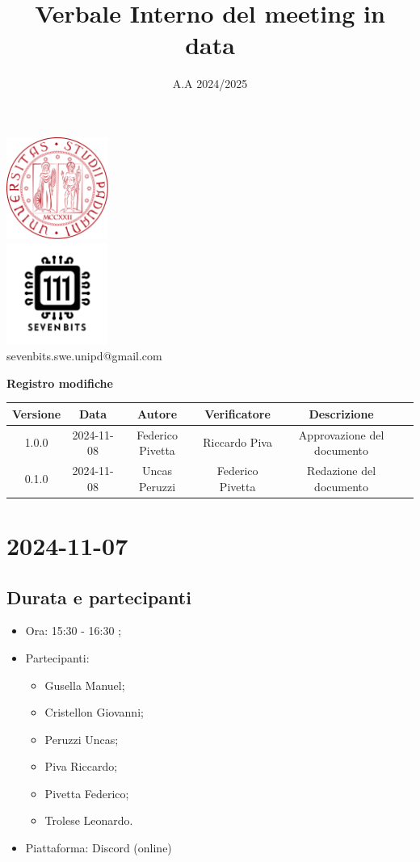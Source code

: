 \documentclass[10pt]{article}
\title{Verbale Interno del meeting in data}
\date{A.A 2024/2025}
\begin{document}
\maketitle
\center 
\includegraphics[width=0.25\textwidth]{LogoUnipd}\\
\includegraphics[width=0.25\textwidth]{Sevenbitslogo}\\
sevenbits.swe.unipd@gmail.com\\
\vspace{2mm}

\textbf{Registro modifiche}\\
\vspace{2mm}
\begin{tabular}{|c|c|c|c|c|c|}
\hline
\textbf{Versione} & \textbf{Data} & \textbf{Autore} & \textbf{Verificatore} & \textbf{Descrizione} \\
\hline
1.0.0 & 2024-11-08 & Federico Pivetta & Riccardo Piva & Approvazione del documento \\
\hline
0.1.0 & 2024-11-08 & Uncas Peruzzi & Federico Pivetta & Redazione del documento \\
\hline
\end{tabular}

\raggedright
\newpage
\tableofcontents
\newpage
\section{2024-11-07}
\subsection{Durata e partecipanti}
\begin{itemize}
\item Ora: 15:30 - 16:30 ;
\item Partecipanti: 	
	\begin{itemize}
	\item Gusella Manuel;
	\item Cristellon Giovanni;
	\item Peruzzi Uncas;
	\item Piva Riccardo;
	\item Pivetta Federico;
	\item Trolese Leonardo.
	\end{itemize}
\item Piattaforma: Discord (online)
\end{itemize}
\end{document}
